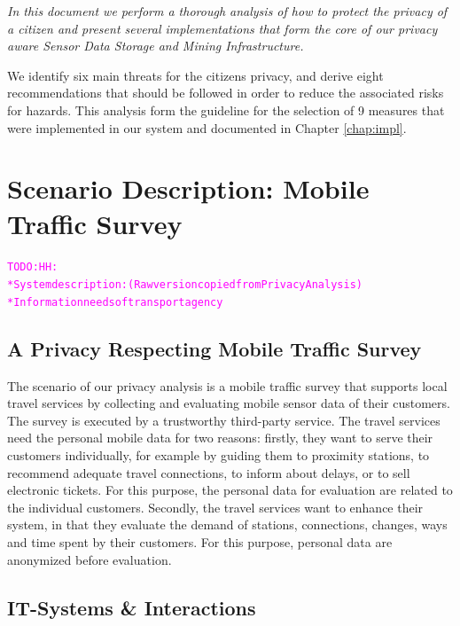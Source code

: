 \documentclass[runningheads,a4paper]{llncs}
\newcommand{\TODO}[1]{\begin{alltt}\textcolor{magenta}{TODO: #1}\end{alltt}}
\newenvironment{LGContent}
{ \par\color{blue} \it \small }
{ \par }
\begin{document}
\begin{LGContent}
In this document we perform a thorough analysis of how to protect the
privacy of a citizen and present several implementations that form the
core of our privacy aware Sensor Data Storage and Mining Infrastructure.

We identify six main threats for the citizens privacy, and derive
eight recommendations that should be followed in order to reduce the
associated risks for hazards.  This analysis form the guideline for
the selection of 9 measures that were implemented in our system and
documented in Chapter \ref{chap:impl}.
\end{LGContent}


\section{Scenario Description: Mobile Traffic Survey}

\TODO{HH:\\
* System description: (Raw version copied from Privacy Analysis)\\
* Information needs of transport agency\\
}

\subsection{A Privacy Respecting Mobile Traffic Survey}

The scenario of our privacy analysis is a mobile traffic survey that supports local travel services by collecting and evaluating mobile sensor data of their customers. The survey is executed by a trustworthy third-party service. The travel services need the personal mobile data for two reasons: firstly, they want to serve their customers individually, for example by guiding them to proximity stations, to recommend adequate travel connections, to inform about delays, or to sell electronic tickets. For this purpose, the personal data for evaluation are related to the individual customers. Secondly, the travel services want to enhance their system, in that they evaluate the demand of stations, connections, changes, ways and time spent by their customers. For this purpose, personal data are anonymized before evaluation. 


\subsection{IT-Systems \& Interactions}
\label{subsubsection:it-systems}
\end{document}
